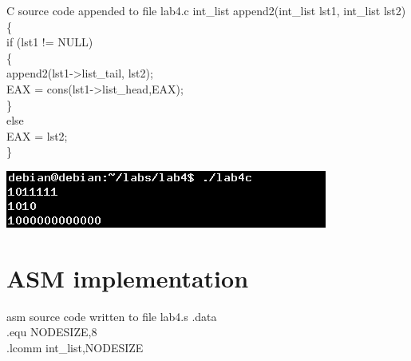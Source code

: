 \documentclass{article}
\begin{document}
\begin{GFT}{C source code appended to file lab4.c}
\+int\_list append2(int\_list lst1, int\_list lst2)\\
\+\{\\
\+  if (lst1 != NULL)\\
\+  \{\\
\+    append2(lst1->list\_tail, lst2);\\
\+    EAX = cons(lst1->list\_head,EAX);\\
\+  \}\\
\+  else \\
\+    EAX = lst2;\\
\+\}\\
\end{GFT}
\includegraphics[scale=0.8]{lab4c.png}
\clearpage\section{ASM implementation}
\begin{GFT}{asm source code written to file lab4.s}
\+.data \\
\+  .equ NODESIZE,8\\
\+  .lcomm int\_list,NODESIZE\\
\end{GFT}
\end{document}
